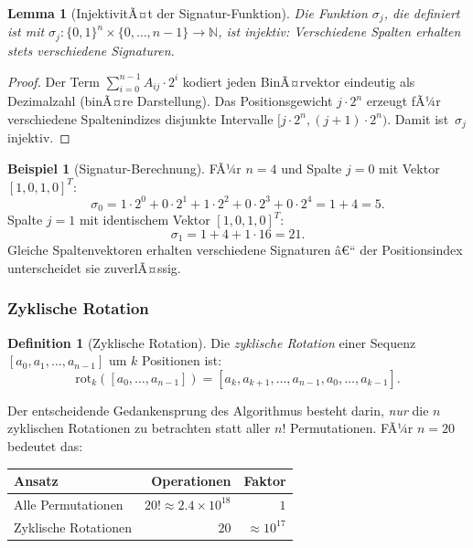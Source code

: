 ﻿\documentclass[12pt,a4paper,twoside]{article}
\theoremstyle{definition}
\newtheorem{definition}{Definition}[section]
\newtheorem{beispiel}{Beispiel}[section]
\theoremstyle{plain}
\newtheorem{lemma}[theorem]{Lemma}
\theoremstyle{remark}
\begin{document}
\begin{lemma}[InjektivitÃ¤t der Signatur-Funktion]
Die Funktion $\sigma_j$, die definiert ist mit $\sigma_j: \{0,1\}^n \times \{0,\ldots,n{-}1\} \to \mathbb{N}$, ist injektiv: Verschiedene Spalten erhalten stets verschiedene
Signaturen.
\end{lemma}

\begin{proof}
Der Term $\sum_{i=0}^{n-1} A_{ij} \cdot 2^i$ kodiert jeden
BinÃ¤rvektor eindeutig als Dezimalzahl (binÃ¤re Darstellung).
Das Positionsgewicht $j \cdot 2^n$ erzeugt fÃ¼r verschiedene
Spaltenindizes disjunkte Intervalle $[j \cdot 2^n, (j{+}1) \cdot 2^n)$.
Damit ist~$\sigma_j$ injektiv.
\end{proof}

\begin{beispiel}[Signatur-Berechnung]
FÃ¼r $n=4$ und Spalte $j=0$ mit Vektor $[1, 0, 1, 0]^T$:
\[
  \sigma_0 = 1 \cdot 2^0 + 0 \cdot 2^1 + 1 \cdot 2^2 + 0 \cdot 2^3
           + 0 \cdot 2^4 = 1 + 4 = 5.
\]
Spalte $j=1$ mit identischem Vektor $[1, 0, 1, 0]^T$:
\[
  \sigma_1 = 1 + 4 + 1 \cdot 16 = 21.
\]
Gleiche Spaltenvektoren erhalten verschiedene Signaturen â€“
der Positionsindex unterscheidet sie zuverlÃ¤ssig.
\end{beispiel}

\subsubsection{Zyklische Rotation}

\begin{definition}[Zyklische Rotation]
Die \emph{zyklische Rotation} einer Sequenz
$[a_0, a_1, \ldots, a_{n-1}]$ um $k$ Positionen ist:
\[
  \mathrm{rot}_k([a_0, \ldots, a_{n-1}])
  = [a_k, a_{k+1}, \ldots, a_{n-1}, a_0, \ldots, a_{k-1}].
\]
\end{definition}

Der entscheidende Gedankensprung des Algorithmus besteht darin,
\emph{nur} die $n$ zyklischen Rotationen zu betrachten statt aller
$n!$ Permutationen.  FÃ¼r $n = 20$ bedeutet das:

\begin{center}
\begin{tabular}{lrr}
  \toprule
  Ansatz & Operationen & Faktor \\
  \midrule
  Alle Permutationen & $20! \approx 2.4 \times 10^{18}$ & $1$ \\
  Zyklische Rotationen & $20$ & $\approx 10^{17}$ \\
  \bottomrule
\end{tabular}
\end{center}
\end{document}
